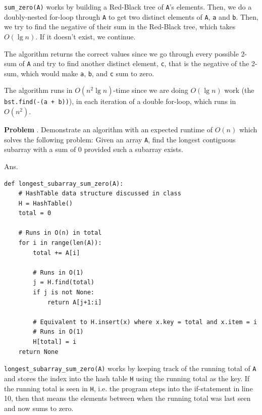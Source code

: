 \documentclass[11pt]{article}
\newcounter{problem}
\newcommand{\problem}[1]{
    \refstepcounter{problem}
    \noindent\textbf{Problem \theproblem}. #1
}
\theoremstyle{claim}
\newcommand{\answer}[1]{
    \noindent Ans. #1
}
\begin{document}
\noindent
\texttt{sum\_zero(A)} works by building a Red-Black tree of \texttt{A}'s elements. Then, we do a doubly-nested for-loop through \texttt{A} to get two distinct elements of \texttt{A}, \texttt{a} and \texttt{b}. Then, we try to find the negative of their sum in the Red-Black tree, which takes \(O(\lg n)\). If it doesn't exist, we continue.

\noindent
The algorithm returns the correct values since we go through every possible 2-sum of \texttt{A} and try to find another distinct element, \texttt{c}, that is the negative of the 2-sum, which would make \texttt{a}, \texttt{b}, and \texttt{c} sum to zero.

\noindent
The algorithm runs in \(O(n^2 \lg n)\)-time since we are doing \(O(\lg n)\) work (the \texttt{bst.find(-(a + b))}), in each iteration of a double for-loop, which runs in \(O(n^2)\).

\pagebreak

\problem{%
    Demonstrate an algorithm with an expected runtime of \(O(n)\) which solves the following problem: Given an array \texttt{A}, find the longest contiguous subarray with a sum of 0 provided such a subarray exists.
}

\answer{}
\begin{listing}[h]
\centering
\begin{verbatim}
def longest_subarray_sum_zero(A):
    # HashTable data structure discussed in class
    H = HashTable()
    total = 0

    # Runs in O(n) in total
    for i in range(len(A)):
        total += A[i]

        # Runs in O(1)
        j = H.find(total)
        if j is not None:
            return A[j+1:i]

        # Equivalent to H.insert(x) where x.key = total and x.item = i
        # Runs in O(1)
        H[total] = i
    return None
\end{verbatim}
\end{listing}

\noindent
\texttt{longest\_subarray\_sum\_zero(A)} works by keeping track of the running total of \texttt{A} and stores the index into the hash table \texttt{H} using the running total as the key. If the running total is seen in \texttt{H}, i.e. the program steps into the if-statement in line 10, then that means the elements between when the running total was last seen and now sums to zero.
\end{document}
